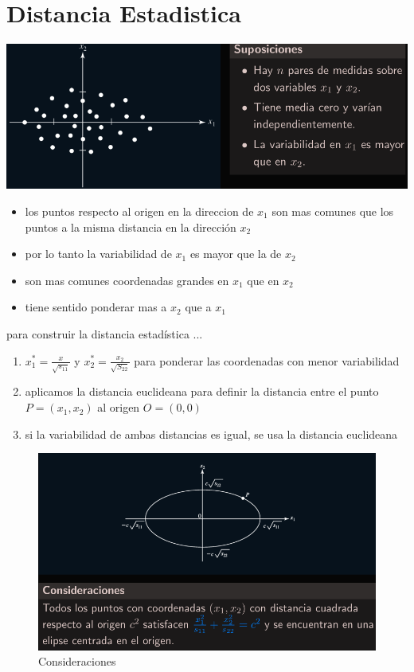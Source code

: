 \documentclass[10pt,a4paper]{article} %
\begin{document}
    \section{Distancia Estadistica}
        \includegraphics[width=0.8\linewidth]{dis.png}
        \begin{itemize}
            \item {los puntos respecto al origen en la direccion de $ x_1  $
                son mas comunes que los puntos a la misma distancia en la
            dirección $ x_2  $ }
            \item {por lo tanto la variabilidad de $ x_1   $ es mayor que la de
                $ x_2  $  }
            \item {son mas comunes coordenadas grandes en $ x_1  $ que en $ x_2
                $  }
            \item {tiene sentido ponderar mas a $ x_2  $ que a $ x_1  $ }
        \end{itemize}
        para construir la distancia estadística ...
        \begin{enumerate}
            \item {$ x_1 ^{*} = \frac{x}{\sqrt{s_{11}}  }  $  y $ x_2 ^{*}  =
                    \frac{x_2}{\sqrt{S_{22}} }$  para ponderar las coordenadas con menor variabilidad }
                \item {aplicamos la distancia euclideana para definir la
                    distancia entre el punto $ P=(x_1 , x_2 )  $ al origen $ O
                = (0,0)  $ }
                \item {si la variabilidad de ambas distancias es igual, se usa
                    la distancia euclideana}
        \end{enumerate}
        \begin{figure}[h!]
            \centering
            \includegraphics[width=0.8\linewidth]{consideraciones.png}
            \caption{Consideraciones}
            \label{fig:consideraciones}
        \end{figure}
\end{document}

